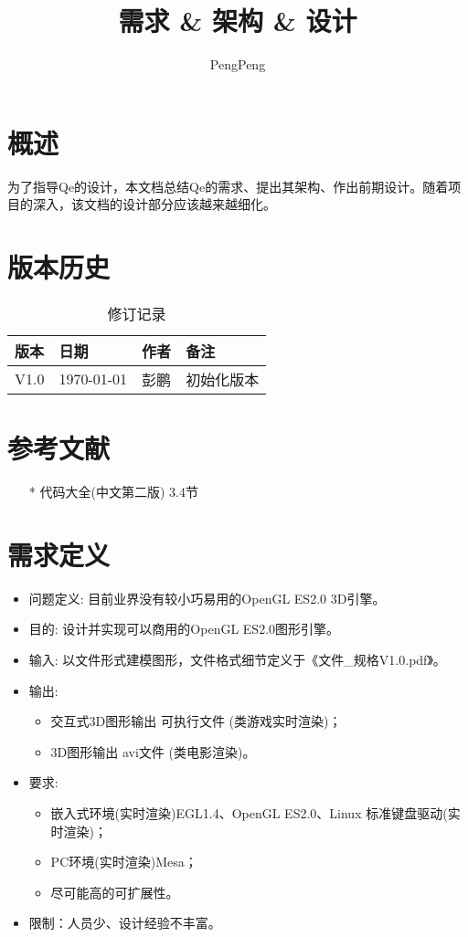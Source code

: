 \documentclass[12pt,a4paper]{report}
\title{需求 \& 架构 \& 设计}
\author{PengPeng}
\begin{document}
\maketitle
\tableofcontents
\newpage

\chapter{概述}
为了指导Qe的设计，本文档总结Qe的需求、提出其架构、作出前期设计。随着项目的深入，该文档的设计部分应该越来越细化。
\newpage

\chapter{版本历史}
\begin{table}[!hbp]
\begin{center}
	\begin{tabular}{|l|l|l|l|}
		\hline
		版本 & 日期 & 作者 & 备注 \\
		\hline
		V1.0 & \today & 彭鹏 & 初始化版本 \\
		\hline
	\end{tabular}
	\caption{修订记录}
\end{center}
\end{table} 
\newpage

\chapter{参考文献}
\begin{enumerate}
	\item[*] 代码大全(中文第二版) 3.4节
\end{enumerate}
\newpage

\chapter{需求定义}
\begin{itemize}
	\item 问题定义: 目前业界没有较小巧易用的OpenGL ES2.0  3D引擎。
	\item 目的: 设计并实现可以商用的OpenGL ES2.0图形引擎。
	\item 输入: 以文件形式建模图形，文件格式细节定义于《文件\_规格V1.0.pdf》。
	\item 输出:
		\begin{itemize}
			\item 交互式3D图形输出 可执行文件 (类游戏实时渲染)；
			\item 3D图形输出 avi文件 (类电影渲染)。
		\end{itemize}
	\item 要求:
		\begin{itemize}
			\item 嵌入式环境(实时渲染)EGL1.4、OpenGL ES2.0、Linux 标准键盘驱动(实时渲染)；
			\item PC环境(实时渲染)Mesa；
			\item 尽可能高的可扩展性。
		\end{itemize}
	\item 限制：人员少、设计经验不丰富。
\end{itemize}
 
\end{document}
